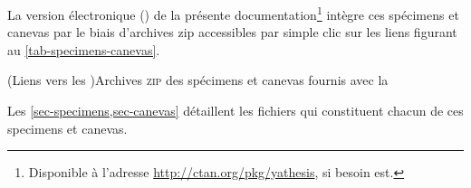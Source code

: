 La version électronique (\pdf{}) de la présente
documentation\footnote{Disponible à l'adresse
  \url{http://ctan.org/pkg/yathesis}, si besoin est.} intègre ces spécimens et
canevas par le biais d'archives \gls{zip} %
accessibles par simple clic sur les liens figurant au
\vref{tab-specimens-canevas}.
%
%
%
%
  \begin{table}[ht]
    \centering
    \caption[Archives \textsc{zip} des spécimens et canevas fournis]{(Liens vers
      les )Archives \textsc{zip} des spécimens et canevas fournis avec la
      \yatcl{}}
    \label{tab-specimens-canevas}
    
  \end{table}
%
\begin{comment}
  \begin{itemize}
  \item pour la distribution \TeX{} Live\versiontl, sur les systèmes :
    \begin{itemize}
    \item Linux et Mac OS X :
      \href{./.}{\folder{\unixtldirectory\tldistdirectory\jobdocdirectory/}} ;
    \item Windows :
      \href{./.}{\folder{\wintldirectory\tldistdirectory\jobdocdirectory/}} ;
    \end{itemize}
  \item pour la distribution MiK\TeX{} : \folder{\miktexdistdirectory}.
  \end{itemize}
\end{comment}

Les \vref{sec-specimens,sec-canevas} détaillent les fichiers qui constituent
chacun de ces specimens et canevas.



